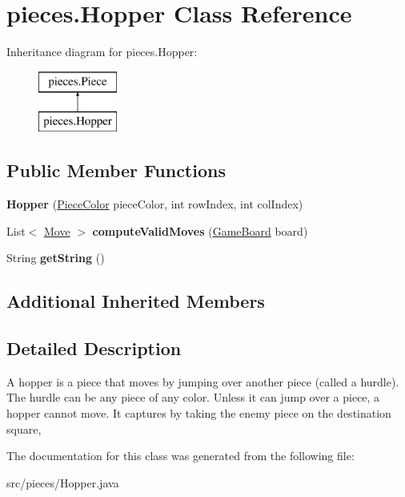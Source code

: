 \hypertarget{classpieces_1_1_hopper}{}\section{pieces.\+Hopper Class Reference}
\label{classpieces_1_1_hopper}
Inheritance diagram for pieces.\+Hopper\+:\begin{figure}[H]
\begin{center}
\leavevmode
\includegraphics[height=2.000000cm]{classpieces_1_1_hopper}
\end{center}
\end{figure}
\subsection*{Public Member Functions}
\begin{DoxyCompactItemize}
\item 
\mbox{\label{classpieces_1_1_hopper_a11e903d52e8635b68167df64addd4d69}} 
{\bfseries Hopper} (\mbox{\hyperlink{enumpieces_1_1_piece_1_1_piece_color}{Piece\+Color}} piece\+Color, int row\+Index, int col\+Index)
\item 
\mbox{\label{classpieces_1_1_hopper_ab73282e84292df92c6146d9dde65e738}} 
List$<$ \mbox{\hyperlink{classpieces_1_1_move}{Move}} $>$ {\bfseries compute\+Valid\+Moves} (\mbox{\hyperlink{classgameboard_1_1_game_board}{Game\+Board}} board)
\item 
\mbox{\label{classpieces_1_1_hopper_a498def214c5db9ec4db24cefcab4d682}} 
String {\bfseries get\+String} ()
\end{DoxyCompactItemize}
\subsection*{Additional Inherited Members}


\subsection{Detailed Description}
A hopper is a piece that moves by jumping over another piece (called a hurdle). The hurdle can be any piece of any color. Unless it can jump over a piece, a hopper cannot move. It captures by taking the enemy piece on the destination square, 

The documentation for this class was generated from the following file\+:\begin{DoxyCompactItemize}
\item 
src/pieces/Hopper.\+java\end{DoxyCompactItemize}
